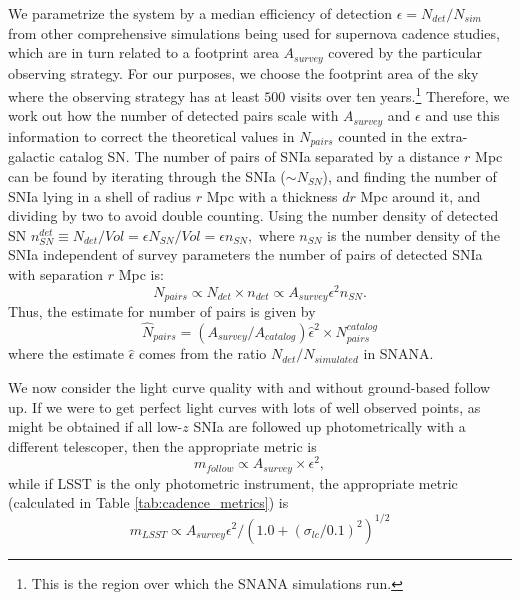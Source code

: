 \documentclass[a4paper,10pt]{article}
\begin{document}
We parametrize the system by a median efficiency of detection $\epsilon = N_{det}/N_{sim}$ from other comprehensive simulations being used for supernova cadence studies, which are in turn related to a footprint area $A_{survey}$ covered by the particular observing strategy. For our purposes, we choose the footprint area of the sky where the observing strategy has at least $500$ visits over ten years.\footnote{This is the region over which the SNANA simulations run.}
Therefore, we work out how the number of detected pairs scale with $A_{survey}$ and $\epsilon$ and use this information to correct the theoretical values in $N_{pairs}$ counted in the extra-galactic catalog SN. The number of pairs of SNIa separated by a distance $r$ Mpc can be found by iterating through the SNIa ($\sim N_{SN}$), and finding the number of SNIa lying in a shell of radius $r$ Mpc with a thickness $dr$ Mpc around it, and dividing by two to avoid double counting. Using the number density of detected SN $n^{det}_{SN} \equiv N_{det}/Vol = \epsilon N_{SN}/Vol = \epsilon n_{SN},$ where $n_{SN}$ is the number density of the SNIa independent of survey parameters the number of pairs of detected SNIa with separation $r$ Mpc is:
    $$
    N_{pairs} \propto N_{det} \times {n_{det}} \propto A_{survey} \epsilon^2 {n_{SN}}.
    $$
Thus, the estimate for number of pairs is given by
$$
    \hat{N}_{pairs} = \left( A_{survey} / A_{catalog} \right)\hat{\epsilon}^2 \times N_{pairs}^{catalog}
    $$
where the estimate $\hat{\epsilon}$ comes from the ratio $N_{det}/ N_{simulated}$ in SNANA. 

We now consider the light curve quality with and without ground-based follow up.
If we were to get perfect light curves with lots of well observed points, as might be obtained if all low-$z$ SNIa are followed up photometrically with a different telescoper, then the appropriate metric is 
\begin{equation}
    m_{follow} \propto A_{survey} \times \epsilon^2,
\end{equation}
while if LSST is the only photometric instrument, the appropriate metric (calculated in Table \ref{tab:cadence_metrics}) is
\begin{equation}
    m_{LSST} \propto A_{survey} \epsilon^2 /(1.0 + \left(\sigma_{lc}/0.1\right)^2)^{1/2}
\end{equation}
\end{document}
